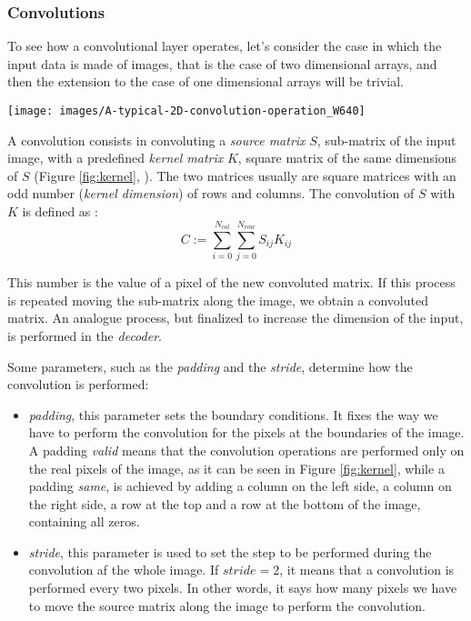 \documentclass[12pt,a4paper,twocolumn]{article}
\begin{document}
		\subsubsection{Convolutions}
		\label{convolution}
		To see how a convolutional layer operates, let's consider the case in which the input data is made of images, that is the case of two dimensional arrays, and then the extension to the case of one dimensional arrays will be trivial. 
		\begin{figure*}[ht]
			\centering
			\texttt{[image: images/A-typical-2D-convolution-operation\_W640]}
			\caption{Example of how a \emph{kernel} (or \emph{filter}) matrix  convolution works. The source matrix is convoluted with the \emph{kernel} matrix. This leads to a number that becomes the output value of a pixel.}
			\label{fig:kernel}
		\end{figure*}
	
		A convolution consists in convoluting a \emph{source matrix} $S$, sub-matrix of the input image, with a predefined \emph{kernel matrix} $K$, square matrix of the same dimensions of $S$ (Figure \ref{fig:kernel}, \cite{kernel_cov}). The two matrices usually are square matrices with an odd number (\emph{kernel dimension}) of rows and columns. The convolution of $S$ with $K$ is defined as \cite{8308186}:
		$$C := \sum_{i=0}^{N_{col}}\sum_{j=0}^{N_{row}} S_{ij}K_{ij}$$
		
		This number is the value of a pixel of the new convoluted matrix. If this process is repeated moving the sub-matrix along the image, we obtain a convoluted matrix. An analogue process, but finalized to increase the dimension of the input, is performed in the \emph{decoder}.
		
		Some parameters, such as the \emph{padding} and the \emph{stride}, determine how the convolution is performed:
		\begin{itemize}
			\item \emph{padding}, this parameter sets the boundary conditions. It fixes the way we have to perform the convolution for the pixels at the boundaries of the image. A padding \emph{valid} means  that the convolution operations are performed only on the real pixels of the image, as it can be seen in Figure \ref{fig:kernel}, while a padding \emph{same}, is achieved by adding a column on the left side, a column on the right side, a row at the top and a row at the bottom of the image, containing all zeros.
			\item \emph{stride}, this parameter is used to set the step to be performed during the convolution af the whole image. If $stride=2$, it means that a convolution  is performed every two pixels. In other words, it says how many pixels we have to move the source matrix along the image to perform the convolution.
		\end{itemize}
		
\end{document}
